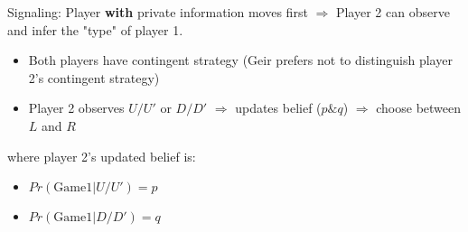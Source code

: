 \documentclass{article}
\begin{document}
\bigskip

\begin{mdframed}[backgroundcolor=blue!20,linecolor=white]
Signaling: Player \textbf{with} private information moves first $\Rightarrow$ 
Player 2 can observe and infer the "type" of player 1.

\begin{itemize}
\item Both players have contingent strategy (Geir prefers not to distinguish player 2's contingent strategy)
\item Player 2 observes $U/U'$ or $D/D'$ $\Rightarrow$ updates belief ($p\&q$) $\Rightarrow$ choose between $L$ and $R$
\end{itemize}

 where player 2's updated belief is:
\begin{itemize}
\item $Pr(\text{Game1} | U/U') = p$
\item $Pr(\text{Game1} | D/D') = q$
\end{itemize}


\end{mdframed}
\end{document}
